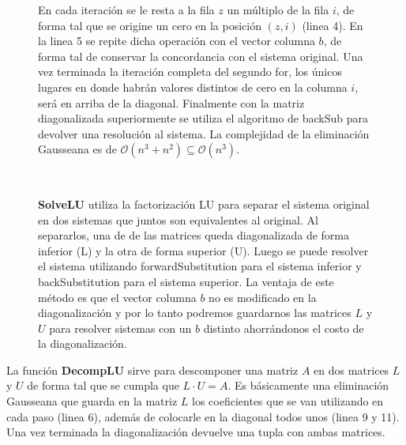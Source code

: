\begin{figure}[!htb]
En cada iteraci\'on se le resta a la fila $z$ un m\'ultiplo de la fila $i$, de forma tal que se origine un cero en la posici\'on $(z,i)$ (linea 4). En la linea 5 se repite dicha operaci\'on con el vector columna $b$, de forma tal de conservar la concordancia con el sistema original. Una vez terminada la iteraci\'on completa del segundo for, los \'unicos lugares en donde habr\'an valores distintos de cero en la columna $i$, ser\'a en arriba de la diagonal. Finalmente con la matriz diagonalizada superiormente se utiliza el algoritmo de backSub para devolver una resoluci\'on al sistema. La complejidad de la eliminaci\'on Gausseana es de $\mathcal{O}(n^3 + n^2) \subseteq \mathcal{O}(n^3)$.

~

\textbf{SolveLU} utiliza la factorizaci\'on LU para separar el sistema original en dos sistemas que juntos son equivalentes al original. Al separarlos, una de de las matrices queda diagonalizada de forma inferior (L) y la otra de forma superior (U). Luego se puede resolver el sistema utilizando forwardSubstitution para el sistema inferior y backSubstitution para el sistema superior. La ventaja de este m\'etodo es que el vector columna $b$ no es modificado en la diagonalizaci\'on y por lo tanto podremos guardarnos las matrices $L$ y $U$ para resolver sistemas con un $b$ distinto ahorr\'andonos el costo de la diagonalizaci\'on.

\endminipage\hfill
\end{figure}

La funci\'on \textbf{DecompLU} sirve para descomponer una matriz $A$ en dos matrices $L$ y $U$ de forma tal que se cumpla que $L\cdot U = A$. Es b\'asicamente una eliminaci\'on Gausseana que guarda en la matriz $L$ los coeficientes que se van utilizando en cada paso (linea 6), adem\'as de colocarle en la diagonal todos unos (linea 9 y 11). Una vez terminada la diagonalizaci\'on devuelve una tupla con ambas matrices. 


